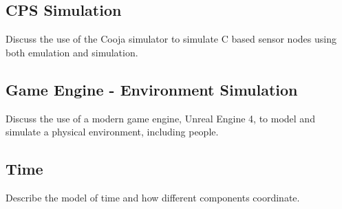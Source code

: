 \subsection{CPS Simulation} %
\label{sub:cps_simulation}
Discuss the use of the Cooja simulator to simulate C based sensor nodes using both emulation and simulation.

\subsection{Game Engine - Environment Simulation} %
\label{sub:environment_simulation}
Discuss the use of a modern game engine, Unreal Engine 4, to model and simulate a physical environment, including people.

\subsection{Time} %
\label{sub:time}
Describe the model of time and how different components coordinate.
